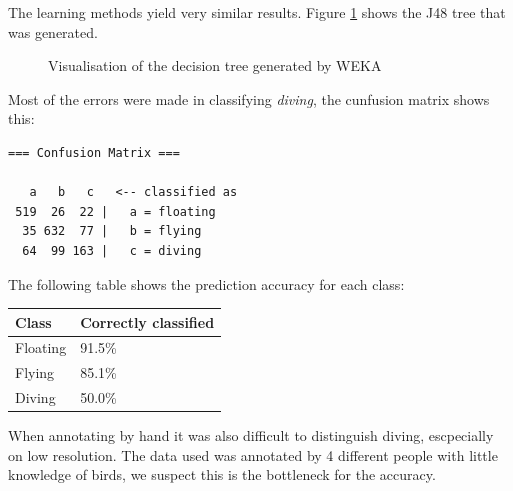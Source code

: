 The learning methods yield very similar results. Figure \ref{fig:tree} shows the J48 tree that was generated. 

\begin{figure}
\begin{center}
  \caption{Visualisation of the decision tree generated by WEKA}
  \label{fig:tree}
\end{center}
\end{figure}

Most of the errors were made in classifying \emph{diving}, the cunfusion matrix shows this:
\begin{verbatim}
=== Confusion Matrix ===

   a   b   c   <-- classified as
 519  26  22 |   a = floating
  35 632  77 |   b = flying
  64  99 163 |   c = diving
\end{verbatim}
The following table shows the prediction accuracy for each class:
\begin{center}
\begin{tabular}{l|l}
	\textnormal{Class} & \textnormal{Correctly classified} \\ \hline 
	Floating & 91.5\% \\
	Flying &  85.1\% \\
	Diving & 50.0\% \\
\end{tabular}
\end{center}

When annotating by hand it was also difficult to distinguish diving, escpecially on low resolution. The data used was annotated by 4 different people with little knowledge of birds, we suspect this is the bottleneck for the accuracy. 